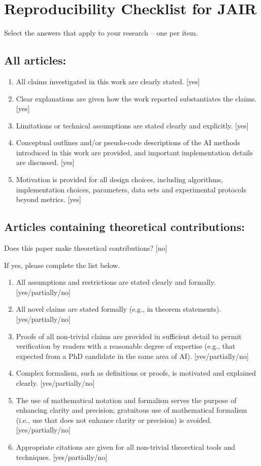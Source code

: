 \section{Reproducibility Checklist for JAIR}

Select the answers that apply to your research -- one per item.

\subsection*{All articles:}

\begin{enumerate}
    \item All claims investigated in this work are clearly stated.
    [yes]
    \item Clear explanations are given how the work reported substantiates the claims.
    [yes]
    \item Limitations or technical assumptions are stated clearly and explicitly.
    [yes]
    \item Conceptual outlines and/or pseudo-code descriptions of the AI methods introduced in this work are provided, and important implementation details are discussed.
    [yes]
    \item
    Motivation is provided for all design choices, including algorithms, implementation choices, parameters, data sets and experimental protocols beyond metrics.
    [yes]
\end{enumerate}

\subsection*{Articles containing theoretical contributions:}
Does this paper make theoretical contributions?
[no]

If yes, please complete the list below.

\begin{enumerate}
    \item All assumptions and restrictions are stated clearly and formally.
    [yes/partially/no]
    \item All novel claims are stated formally (e.g., in theorem statements).
    [yes/partially/no]
    \item Proofs of all non-trivial claims are provided in sufficient detail to permit verification by readers with a reasonable degree of expertise (e.g., that expected from a PhD candidate in the same area of AI). [yes/partially/no]
    \item
    Complex formalism, such as definitions or proofs, is motivated and explained clearly.
    [yes/partially/no]
    \item
    The use of mathematical notation and formalism serves the purpose of enhancing clarity and precision; gratuitous use of mathematical formalism (i.e., use that does not enhance clarity or precision) is avoided.
    [yes/partially/no]
    \item
    Appropriate citations are given for all non-trivial theoretical tools and techniques.
    [yes/partially/no]
\end{enumerate}

